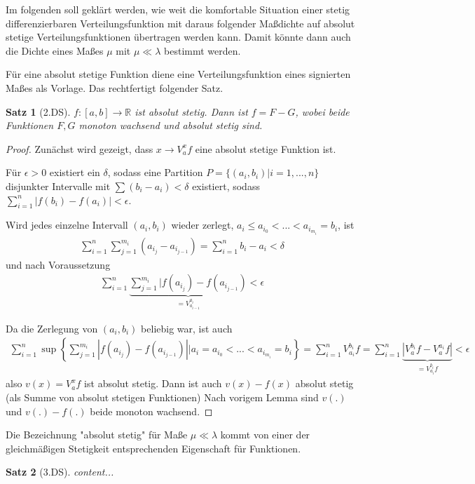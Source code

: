 \documentclass[]{article}
\newtheorem{theorem}{Satz}
\begin{document}
Im folgenden soll geklärt werden, wie weit die komfortable Situation einer stetig differenzierbaren Verteilungsfunktion mit daraus folgender Maßdichte auf absolut stetige Verteilungsfunktionen übertragen werden kann. Damit könnte dann auch die Dichte eines Maßes $\mu$ mit $\mu \ll \lambda$ bestimmt werden.

Für eine absolut stetige Funktion diene eine Verteilungsfunktion eines signierten Maßes als Vorlage. Das rechtfertigt folgender Satz.

\begin{theorem}[2.DS]
	$f:[a,b]\rightarrow\mathbb{R}$ ist absolut stetig. Dann ist $f = F-G$, wobei beide Funktionen $F,G$ monoton wachsend und absolut stetig sind.
\end{theorem}
\begin{proof}
	Zunächst wird gezeigt, dass $x \rightarrow V_a^x f$ eine absolut stetige Funktion ist.
	
	Für $\epsilon > 0$ existiert ein $\delta$, sodass eine Partition $P = \{(a_i,b_i)|i=1,...,n\}$ disjunkter Intervalle mit $\sum (b_i - a_i) < \delta$ existiert, sodass $\sum_{i=1}^{n} |f(b_i) - f(a_i)| < \epsilon$.
	
	Wird jedes einzelne Intervall $(a_i, b_i)$ wieder zerlegt, $a_i \leq a_{i_0} < ... < a_{i_{m_i}} = b_i$, ist
	\begin{align*}
		\sum_{i=1}^{n} \sum_{j=1}^{m_i} (a_{i_j} - a_{i_{j-1}}) = \sum_{i=1}^{n} b_i - a_i < \delta
	\end{align*}
	und nach Voraussetzung
	\begin{align*}
		\sum_{i=1}^{n} \underbrace{\sum_{j=1}^{m_i} |f(a_{i_j}) - f(a_{i_{j-1}})}_{=V_{a_{i-1}}^{a_i}} < \epsilon
	\end{align*}

	Da die Zerlegung von $(a_i,b_i)$ beliebig war, ist auch
	\begin{align*}
		\sum_{i=1}^{n} \sup \left\{\sum_{j=1}^{m_i} |f(a_{i_j}) - f({a_{i_{j-1}}})| \big| a_i = a_{i_0} < ... < a_{i_{m_i}} = b_i\right\} = \sum_{i=1}^{n} V_{a_i}^{b_i} f = \sum_{i=1}^{n} \underbrace{|V_a^{b_i}f - V_a^{a_i} f|}_{=V_{a_i}^{b_i} f} < \epsilon
	\end{align*}
	also $v(x)=V_a^x f$ ist absolut stetig. Dann ist auch $v(x)-f(x)$ absolut stetig (als Summe von absolut stetigen Funktionen) Nach vorigem Lemma sind $v(.)$ und $v(.)-f(.)$ beide monoton wachsend.
\end{proof}

Die Bezeichnung "absolut stetig" für Maße $\mu \ll \lambda$ kommt von einer der gleichmäßigen Stetigkeit entsprechenden Eigenschaft für Funktionen.

\begin{theorem}[3.DS]
	content...
\end{theorem}
\end{document}
